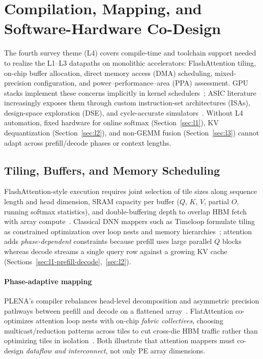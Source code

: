 \documentclass[conference]{IEEEtran}
\begin{document}
\section{Compilation, Mapping, and Software-Hardware Co-Design}
\label{sec:l4}

The fourth survey theme (L4) covers compile-time and toolchain support needed to realize the L1--L3 datapaths on monolithic accelerators: FlashAttention tiling, on-chip buffer allocation, direct memory access (DMA) scheduling, mixed-precision configuration, and power--performance--area (PPA) assessment.
GPU stacks implement these concerns implicitly in kernel schedulers~\cite{dao2022flashattention,shah2024flashattention3,sawint42026}; ASIC literature increasingly exposes them through custom instruction-set architectures (ISAs), design-space exploration (DSE), and cycle-accurate simulators~\cite{plena2025,flatattention2026,klhufek2025transinfersim}.
Without L4 automation, fixed hardware for online softmax (Section~\ref{sec:l1}), KV dequantization (Section~\ref{sec:l2}), and non-GEMM fusion (Section~\ref{sec:l3}) cannot adapt across prefill/decode phases or context lengths.

\subsection{Tiling, Buffers, and Memory Scheduling}
\label{sec:l4-tiling}

FlashAttention-style execution requires joint selection of tile sizes along sequence length and head dimension, SRAM capacity per buffer ($Q$, $K$, $V$, partial $O$, running softmax statistics), and double-buffering depth to overlap HBM fetch with array compute~\cite{dao2022flashattention,lin2025systolicattention,plena2025}.
Classical DNN mappers such as Timeloop formulate tiling as constrained optimization over loop nests and memory hierarchies~\cite{parashar2019timeloop,chen2016eyeriss}; attention adds \emph{phase-dependent} constraints because prefill uses large parallel $Q$ blocks whereas decode streams a single query row against a growing KV cache (Sections~\ref{sec:l1-prefill-decode},~\ref{sec:l2}).

\paragraph{Phase-adaptive mapping}
PLENA's compiler rebalances head-level decomposition and asymmetric precision pathways between prefill and decode on a flattened array~\cite{plena2025}.
FlatAttention co-optimizes attention loop nests with on-chip \emph{fabric collectives}, choosing multicast/reduction patterns across tiles to cut cross-die HBM traffic rather than optimizing tiles in isolation~\cite{flatattention2026}.
Both illustrate that attention mappers must co-design \emph{dataflow and interconnect}, not only PE array dimensions.
\end{document}
